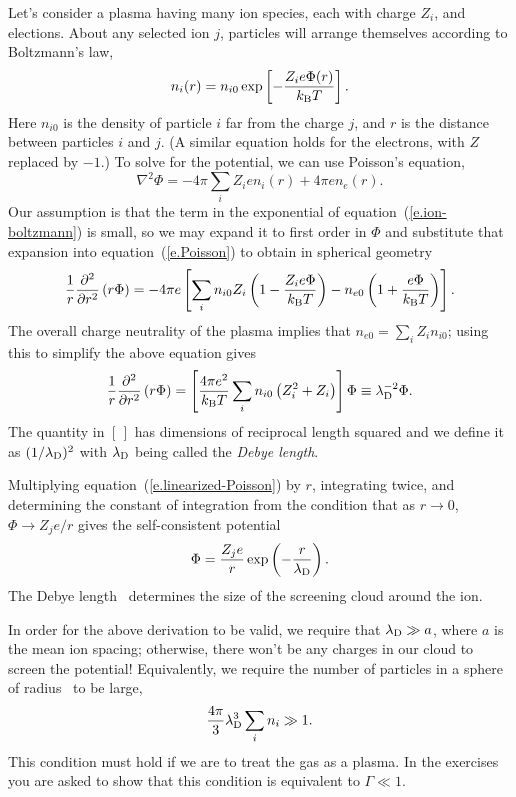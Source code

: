 Let's consider a plasma having many ion species, each with charge $Z_{i}$, and elections. About any selected ion $j$,  particles will arrange themselves according to Boltzmann's law,
\begin{equation}\label{e.ion-boltzmann}
n_{i}(r) = n_{i0}\exp\left[-\frac{Z_{i}e\Phi(r)}{k_\mathrm{B} T}\right].
\end{equation}
Here $n_{i0}$ is the density of particle $i$ far from the charge $j$, and $r$ is the distance between particles $i$ and $j$.  (A similar equation holds for the electrons, with $Z$ replaced by $-1$.) To solve for the potential, we can use Poisson's equation,
\begin{equation}\label{e.Poisson}
\nabla^{2}\Phi = -4\pi \sum_{i} Z_{i}e n_{i}(r) +4\pi e n_{e}(r).
\end{equation}
Our assumption is that the term in the exponential of equation~(\ref{e.ion-boltzmann}) is small, so we may expand it to first order in $\Phi$ and substitute that expansion into equation~(\ref{e.Poisson}) to obtain in spherical geometry
\[
 \frac{1}{r}\frac{\partial^{2}}{\partial r^{2}}\left(r\Phi\right) = -4\pi e \left[\sum_{i} n_{i0}Z_{i}\left(1-\frac{Z_{i}e\Phi}{k_\mathrm{B} T}\right) - n_{e0}\left(1 + \frac{e\Phi}{k_\mathrm{B} T}\right)\right].
\]
The overall charge neutrality of the plasma implies that $n_{e0} = \sum_{i}Z_{i}n_{i0}$; using this to simplify the above equation gives
\begin{equation}\label{e.linearized-Poisson}
\frac{1}{r}\frac{\partial^{2}}{\partial r^{2}}\left(r\Phi\right) = \left[\frac{4\pi e^{2}}{k_\mathrm{B} T}\sum_{i} n_{i0}\left(Z_{i}^{2}+Z_{i}\right)\right]\Phi \equiv \lambda_{\mathrm{D}}^{-2}\Phi.
\end{equation}
The quantity in $[\, ]$ has dimensions of reciprocal length squared and we define it as $(1/\lambda_{\mathrm{D}})^{2}$ with $\lambda_{\mathrm{D}}$ being called the \emph{Debye length}.

Multiplying equation~(\ref{e.linearized-Poisson}) by $r$, integrating twice, and determining the constant of integration from the condition that as $r\to 0$, $\Phi \to Z_{j}e/r$ gives the self-consistent potential
\begin{equation}\label{e.screened-potential}
\Phi = \frac{Z_{j}e}{r}\exp\left(-\frac{r}{\lambda_{\mathrm{D}}}\right).
\end{equation}
The Debye length \lambdaD\ determines the size of the screening cloud around the ion.

In order for the above derivation to be valid, we require that $\lambda_{\mathrm{D}} \gg a$, where $a$ is the mean ion spacing; otherwise, there won't be any charges in our cloud to screen the potential! Equivalently, we require the number of particles in a sphere of radius \lambdaD\ to be large,
\begin{equation}\label{e.plasma-parameter}
\frac{4\pi}{3}\lambda_{\mathrm{D}}^{3} \sum_{i} n_{i} \gg 1.
\end{equation}
This condition must hold if we are to treat the gas as a plasma. In the exercises you are asked to show that this condition is equivalent to $\Gamma \ll 1$.

